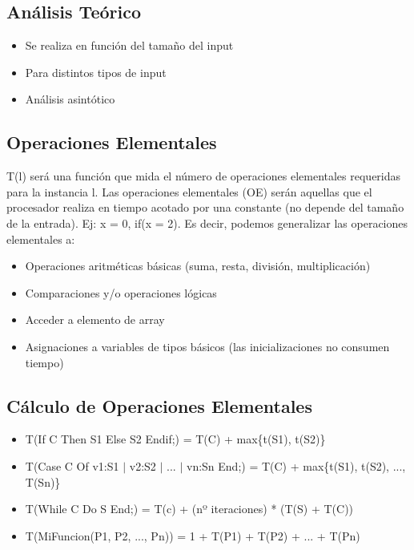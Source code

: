 \documentclass[10pt,a4paper]{article}
\begin{document}
\subsection*{Análisis Teórico}
\begin{itemize}
    \item Se realiza en función del tamaño del input 
    \item Para distintos tipos de input 
    \item Análisis asintótico
\end{itemize}

\subsection*{Operaciones Elementales}
T(l) será una función que mida el número de operaciones elementales requeridas para la instancia l.
Las operaciones elementales (OE) serán aquellas que el procesador realiza en tiempo acotado por una constante (no depende del tamaño de la entrada).
Ej: x = 0, if(x = 2).
Es decir, podemos generalizar las operaciones elementales a:
\begin{itemize}
    \item Operaciones aritméticas básicas (suma, resta, división, multiplicación)
    \item Comparaciones y/o operaciones lógicas
    \item Acceder a elemento de array
    \item Asignaciones a variables de tipos básicos (las inicializaciones no consumen tiempo)
\end{itemize}
\subsection*{Cálculo de Operaciones Elementales}
\begin{itemize}
    \item T(If C Then S1 Else S2 Endif;) = T(C) + max\{t(S1), t(S2)\}
    \item T(Case C Of v1:S1 \(|\) v2:S2 \(|\) ... \(|\) vn:Sn End;) = T(C) + max\{t(S1), t(S2), ..., T(Sn)\}
    \item T(While C Do S End;) = T(c) + (nº iteraciones) * (T(S) + T(C))
    \item T(MiFuncion(P1, P2, ..., Pn)) = 1 + T(P1) + T(P2) + ... + T(Pn)
\end{itemize}
\end{document}
